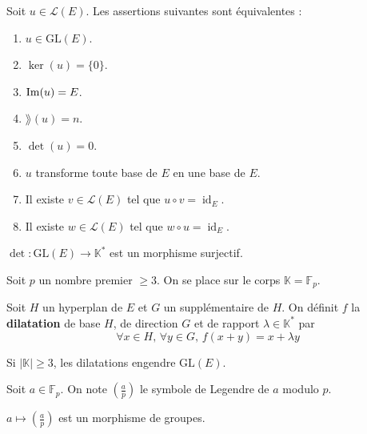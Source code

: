 
  \begin{theorem}
    Soit $u \in \mathcal{L}(E)$. Les assertions suivantes sont équivalentes :
    \begin{enumerate}[label={\bfseries(\roman*)}]
      \item $u \in \mathrm{GL}(E)$.
      \item $\ker(u) = \{ 0 \}$.
      \item $\mathrm{Im}(u) = E$.
      \item $\rang(u) = n$.
      \item $\det(u) = 0$.
      \item $u$ transforme toute base de $E$ en une base de $E$.
      \item Il existe $v \in \mathcal{L}(E)$ tel que $u \circ v = \operatorname{id}_E$.
      \item Il existe $w \in \mathcal{L}(E)$ tel que $w \circ u = \operatorname{id}_E$.
    \end{enumerate}
  \end{theorem}


  \begin{proposition}
    $\det : \mathrm{GL}(E) \rightarrow \mathbb{K}^*$ est un morphisme surjectif.
  \end{proposition}


  Soit $p$ un nombre premier $\geq 3$. On se place sur le corps $\mathbb{K} = \mathbb{F}_p$.

  \begin{definition}
    Soit $H$ un hyperplan de $E$ et $G$ un supplémentaire de $H$. On définit $f$ la \textbf{dilatation} de base $H$, de direction $G$ et de rapport $\lambda \in \mathbb{K}^*$ par
    \[ \forall x \in H, \, \forall y \in G, \, f(x+y) = x + \lambda y \]
  \end{definition}

  \begin{theorem}
    Si $|\mathbb{K}| \geq 3$, les dilatations engendre $\mathrm{GL}(E)$.
  \end{theorem}

  \begin{notation}
    Soit $a \in \mathbb{F}_p$. On note $\left( \frac{a}{p} \right)$ le symbole de Legendre de $a$ modulo $p$.
  \end{notation}

  \begin{lemma}
    $a \mapsto \left( \frac{a}{p} \right)$ est un morphisme de groupes.
  \end{lemma}

